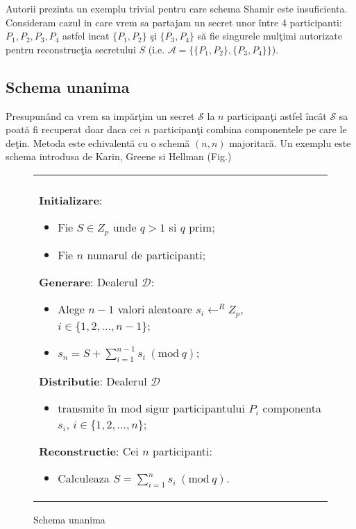 \documentclass{llncs}
\newcommand{\Mod}[1]{\ (\text{mod}\ #1)}
\begin{document}
Autorii prezinta un exemplu trivial pentru care schema Shamir este insuficienta. Consideram cazul in care vrem sa partajam un secret unor \^{i}ntre 4 participanti: $P_1, P_2, P_3, P_4$ astfel incat $\{P_1,P_2\}$ \c{s}i $\{P_3,P_4\}$ s\u{a} fie singurele mul\c{t}imi autorizate pentru reconstruc\c{t}ia secretului $S$ (i.e. $\mathcal{A} = \{ \{P_1,P_2\}, \{P_3,P_4\} \}$).

\subsection{Schema unanima}

Presupun\^{a}nd ca vrem sa imp\u{a}r\c{t}im un secret $\mathcal{S}$ la $n$ participan\c{t}i astfel \^{i}nc\^{a}t $\mathcal{S}$ sa poat\u{a} fi recuperat doar daca cei $n$ participan\c{t}i combina componentele pe care le de\c{t}in. Metoda este echivalent\u{a} cu o schem\u{a} $(n, n)$ majoritar\u{a}. Un exemplu este schema introdusa de Karin, Greene si Hellman \cite{Karnin:83} (Fig.\label{fig:all_or_nothing})


\begin{figure*}[h!]

\begin{tabular}{|p{\textwidth}|}
\hline

\\
\hspace{.1in}
\textbf{Initializare}: 
	\begin{itemize}
		\item Fie $S \in Z_p$ unde $q > 1 $ si $q$ prim;
		\item Fie $n$ numarul de participanti;
	\end{itemize}
\medskip

\hspace{.1in}
\textbf{Generare}: Dealerul $\mathcal{D}$:
	\begin{itemize}
		\setlength{\itemsep}{5pt}
		\item Alege $n - 1$ valori aleatoare $s_i \leftarrow^R Z_p$, $i \in \{1,2,\dots,{n-1}\}$;
		\item $s_n = S + \sum\limits_{i=1}^{n-1} s_i \Mod q $;
	\end{itemize}
\medskip

\hspace{.1in}
\textbf{Distributie}: Dealerul $\mathcal{D}$
	\begin{itemize}
		\item transmite \^{i}n mod sigur participantului $P_i$ componenta $s_i$, $i \in \{1,2,\dots,n\}$;
	\end{itemize}

\hspace{.1in}
\textbf{Reconstructie}: Cei $n$ participanti:
	\begin{itemize}
		\item Calculeaza $S = \sum\limits_{i=1}^{n} s_i \Mod q$.
	\end{itemize}

\\
\hline
\end{tabular}
\caption{Schema unanima \cite{Karnin:83}}
\label{fig:all_or_nothing}
\end{figure*}
\end{document}

